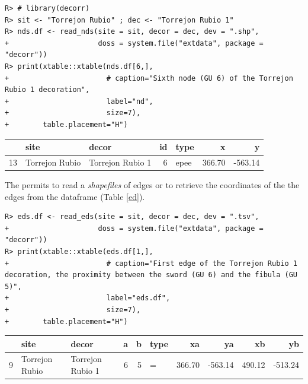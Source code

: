 \documentclass[article]{jss}\usepackage{knitr}
\begin{document}
\begin{kframe}
\begin{verbatim}
R> # library(decorr)
R> sit <- "Torrejon Rubio" ; dec <- "Torrejon Rubio 1"
R> nds.df <- read_nds(site = sit, decor = dec, dev = ".shp",
+                     doss = system.file("extdata", package = "decorr"))
R> print(xtable::xtable(nds.df[6,],
+                       # caption="Sixth node (GU 6) of the Torrejon Rubio 1 decoration",
+                       label="nd",
+                       size=7),
+        table.placement="H")
\end{verbatim}
\end{kframe}%
\begin{table}[H]
\centering
\begin{tabular}{rllrlrr}
  \hline
 & site & decor & id & type & x & y \\ 
  \hline
13 & Torrejon Rubio & Torrejon Rubio 1 &   6 & epee & 366.70 & -563.14 \\ 
   \hline
\end{tabular}
\label{nd}
\end{table}


The  permits to read a \emph{shapefiles} of edges or to retrieve the coordinates of the the edges from the  dataframe (Table \ref{ed}).

\begin{kframe}
\begin{verbatim}
R> eds.df <- read_eds(site = sit, decor = dec, dev = ".tsv",
+                     doss = system.file("extdata", package = "decorr"))
R> print(xtable::xtable(eds.df[1,],
+                       # caption="First edge of the Torrejon Rubio 1 decoration, the proximity between the sword (GU 6) and the fibula (GU 5)",
+                       label="eds.df",
+                       size=7),
+        table.placement="H")
\end{verbatim}
\end{kframe}%
\begin{table}[H]
\centering
\begin{tabular}{rllrrlrrrr}
  \hline
 & site & decor & a & b & type & xa & ya & xb & yb \\ 
  \hline
9 & Torrejon Rubio & Torrejon Rubio 1 &   6 &   5 & = & 366.70 & -563.14 & 490.12 & -513.24 \\ 
   \hline
\end{tabular}
\label{eds.df}
\end{table}
\end{document}
